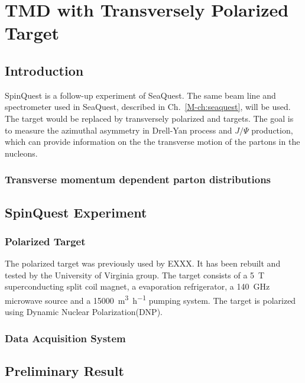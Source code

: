 \documentclass[../main.tex]{subfiles}
\begin{document}
\ifSubfilesClassLoaded{
	\mainmatter
	\setcounter{chapter}{4}
}{}

\chapter{TMD with Transversely Polarized Target}
\label{ch:spinquest}

\section{Introduction}
SpinQuest is a follow-up experiment of SeaQuest\cite{brown2014}. The same beam 
line and spectrometer used in SeaQuest, described in Ch.~\ref{M-ch:seaquest},
will be used. The target would be replaced by transversely polarized 
and  targets. The goal is to measure the azimuthal asymmetry in 
Drell-Yan process and $J/\Psi$ production, which can provide information on the
the transverse motion of the partons in the nucleons.

\subsection{Transverse momentum dependent parton distributions}

\section{SpinQuest Experiment}

\subsection{Polarized Target}
The polarized target was previously used by EXXX.  It has been rebuilt and tested by the University of
Virginia group. The target consists of a \SI{5}{\tesla} superconducting
split coil magnet, a   evaporation refrigerator, a \SI{140}{\GHz}
microwave source and a \SI{15000}{\cubic\meter\per\hour} pumping system. The
target is polarized using Dynamic Nuclear Polarization(DNP)\cite{crabb1995}.

\subsection{Data Acquisition System}

\section{Preliminary Result}

\ifSubfilesClassLoaded{ \printbibliography[heading=bibintoc,title={References}]}{}
\end{document}
